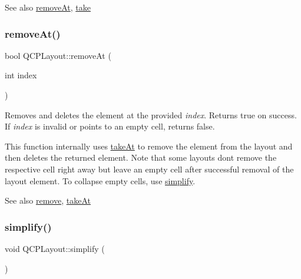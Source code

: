 \begin{DoxySeeAlso}{See also}
\hyperlink{classQCPLayout_a2403f684fee3ce47132faaeed00bb066}{remove\+At}, \hyperlink{classQCPLayout_ada26cd17e56472b0b4d7fbbc96873e4c}{take} 
\end{DoxySeeAlso}
\mbox{\label{classQCPLayout_a2403f684fee3ce47132faaeed00bb066}} 
\subsubsection{\texorpdfstring{remove\+At()}{removeAt()}}
{\footnotesize\ttfamily bool Q\+C\+P\+Layout\+::remove\+At (\begin{DoxyParamCaption}\item[{int}]{index }\end{DoxyParamCaption})}

Removes and deletes the element at the provided {\itshape index}. Returns true on success. If {\itshape index} is invalid or points to an empty cell, returns false.

This function internally uses \hyperlink{classQCPLayout_a5a79621fa0a6eabb8b520cfc04fb601a}{take\+At} to remove the element from the layout and then deletes the returned element. Note that some layouts don\textquotesingle{}t remove the respective cell right away but leave an empty cell after successful removal of the layout element. To collapse empty cells, use \hyperlink{classQCPLayout_a41e6ac049143866e8f8b4964efab01b2}{simplify}.

\begin{DoxySeeAlso}{See also}
\hyperlink{classQCPLayout_a6c58f537d8086f352576ab7c5b15d0bc}{remove}, \hyperlink{classQCPLayout_a5a79621fa0a6eabb8b520cfc04fb601a}{take\+At} 
\end{DoxySeeAlso}
\mbox{\label{classQCPLayout_a41e6ac049143866e8f8b4964efab01b2}} 
\subsubsection{\texorpdfstring{simplify()}{simplify()}}
{\footnotesize\ttfamily void Q\+C\+P\+Layout\+::simplify (\begin{DoxyParamCaption}{ }\end{DoxyParamCaption})\hspace{0.3cm}{\ttfamily [virtual]}}

